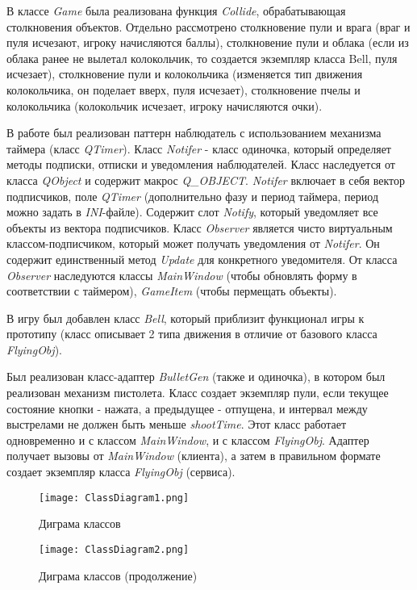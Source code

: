 \documentclass[a4paper,14pt]{article}
\begin{document}
В классе \textit{Game} была реализована функция \textit{Collide}, обрабатывающая столкновения объектов. Отдельно рассмотрено столкновение пули и врага (враг и пуля исчезают, игроку начисляются баллы), столкновение пули и облака (если из облака ранее не вылетал колокольчик, то создается экземпляр класса Bell, пуля исчезает), столкновение пули и колокольчика (изменяется тип движения колокольчика, он поделает вверх, пуля исчезает), столкновение пчелы и колокольчика (колокольчик исчезает, игроку начисляются очки).

В работе был реализован паттерн наблюдатель с использованием механизма таймера (класс \textit{QTimer}). Класс \textit{Notifer} - класс одиночка, который определяет методы подписки, отписки и уведомления наблюдателей. Класс наследуется от класса \textit{QObject} и содержит макрос \textit{Q\_OBJECT}. \textit{Notifer} включает в себя вектор подписчиков, поле \textit{QTimer} (дополнительно фазу и период таймера, период можно задать в \textit{INI}-файле). Содержит слот \textit{Notify}, который уведомляет все объекты из вектора подписчиков. Класс \textit{Observer} является чисто виртуальным классом-подписчиком, который может получать уведомления от \textit{Notifer}. Он содержит единственный метод \textit{Update} для конкретного уведомителя. От класса \textit{Observer} наследуются классы \textit{MainWindow} (чтобы обновлять форму в соответствии с таймером), \textit{GameItem} (чтобы пермещать объекты).

В игру был добавлен класс \textit{Bell}, который приблизит функционал игры к прототипу (класс описывает 2 типа движения в отличие от базового класса \textit{FlyingObj}). 

Был реализован класс-адаптер \textit{BulletGen} (также и одиночка), в котором был реализован механизм пистолета. Класс создает экземпляр пули, если текущее состояние кнопки - нажата, а предыдущее - отпущена, и интервал между выстрелами не должен быть меньше \textit{shootTime}. Этот класс работает одновременно и с классом \textit{MainWindow}, и с классом \textit{FlyingObj}. Адаптер получает вызовы от \textit{MainWindow} (клиента), а затем в правильном формате создает экземпляр класса \textit{FlyingObj} (сервиса).

\begin{figure}[H]
	\centering
	\texttt{[image: ClassDiagram1.png]}
	\caption{Диграма классов}	
\end{figure}
\begin{figure}[H]
	\centering
	\texttt{[image: ClassDiagram2.png]}
	\caption{Диграма классов (продолжение)}	
\end{figure}
\end{document}

